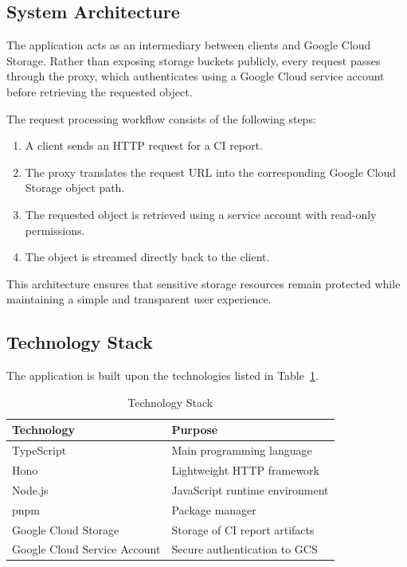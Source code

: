 \subsection{System Architecture}

The application acts as an intermediary between clients and Google Cloud Storage. Rather than exposing storage buckets publicly, every request passes through the proxy, which authenticates using a Google Cloud service account before retrieving the requested object.

The request processing workflow consists of the following steps:

\begin{enumerate}
    \item A client sends an HTTP request for a CI report.
    \item The proxy translates the request URL into the corresponding Google Cloud Storage object path.
    \item The requested object is retrieved using a service account with read-only permissions.
    \item The object is streamed directly back to the client.
\end{enumerate}

This architecture ensures that sensitive storage resources remain protected while maintaining a simple and transparent user experience.

\subsection{Technology Stack}

The application is built upon the technologies listed in Table~\ref{tab:gcs-tech-stack}.

\begin{table}[H]
\centering
\caption{Technology Stack}
\label{tab:gcs-tech-stack}
\begin{tabular}{|l|p{9cm}|}
\hline
\textbf{Technology} & \textbf{Purpose} \\
\hline
TypeScript & Main programming language \\
\hline
Hono & Lightweight HTTP framework \\
\hline
Node.js & JavaScript runtime environment \\
\hline
pnpm & Package manager \\
\hline
Google Cloud Storage & Storage of CI report artifacts \\
\hline
Google Cloud Service Account & Secure authentication to GCS \\
\hline
\end{tabular}
\end{table}

